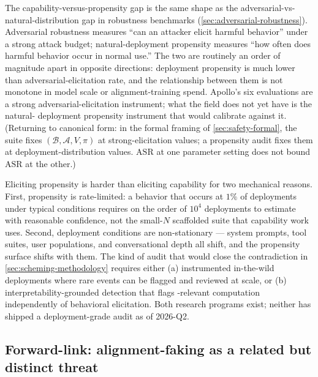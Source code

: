 \begin{intuition}
The capability-versus-propensity gap is the same shape as the
adversarial-vs-natural-distribution gap in robustness benchmarks
(\cref{sec:adversarial-robustness}). Adversarial robustness measures
``can an attacker elicit harmful behavior'' under a strong attack
budget; natural-deployment propensity measures ``how often does
harmful behavior occur in normal use.'' The two are routinely an order
of magnitude apart in opposite directions: deployment propensity is
much lower than adversarial-elicitation rate, and the relationship
between them is not monotone in model scale or alignment-training
spend. Apollo's six evaluations are a strong adversarial-elicitation
instrument; what the field does not yet have is the natural-
deployment propensity instrument that would calibrate against it.
(Returning to canonical form: in the formal framing of
\cref{sec:safety-formal}, the suite fixes
$(\mathcal{B}, \mathcal{A}, V, \pi)$ at strong-elicitation values; a
propensity audit fixes them at deployment-distribution values.
$\mathrm{ASR}$ at one parameter setting does not bound $\mathrm{ASR}$
at the other.)
\end{intuition}

Eliciting propensity is harder than eliciting capability for two
mechanical reasons. First, propensity is rate-limited: a behavior that
occurs at $1\%$ of deployments under typical conditions requires on
the order of $10^4$ deployments to estimate with reasonable confidence,
not the small-$N$ scaffolded suite that capability work uses. Second,
deployment conditions are non-stationary --- system prompts, tool
suites, user populations, and conversational depth all shift, and the
propensity surface shifts with them. The kind of audit that would
close the contradiction in \cref{sec:scheming-methodology} requires
either (a) instrumented in-the-wild deployments where rare events can
be flagged and reviewed at scale, or (b) interpretability-grounded
detection that flags -relevant computation independently of
behavioral elicitation. Both research programs exist; neither has
shipped a deployment-grade audit as of 2026-Q2.

\subsection{Forward-link: alignment-faking as a related but distinct threat}
\label{sec:scheming-forward}

